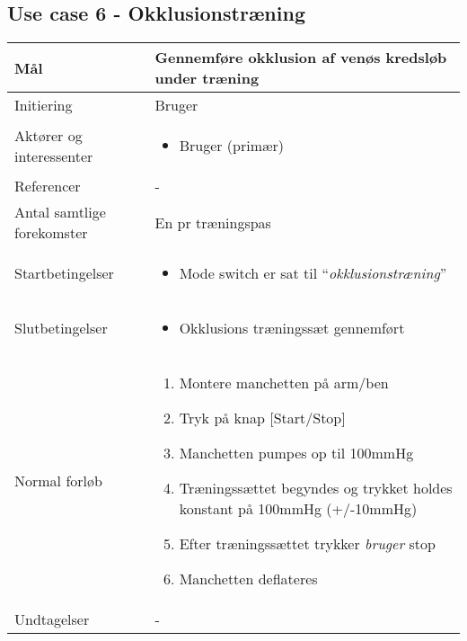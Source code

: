 	\subsection{Use case 6 - Okklusionstræning}
		\begin{center}
			\begin{tabular}{ | p{} | p{}| } 
				\hline
				Mål & Gennemføre okklusion af venøs kredsløb under træning  \\ 
				\hline
				Initiering &  Bruger\\
				\hline
				Aktører og interessenter & 
				\begin{itemize}
					\item Bruger (primær)
				\end{itemize} \\ 
				\hline
				Referencer & - \\ 
				\hline
				Antal samtlige forekomster & En pr træningspas \\ 
				\hline	
				Startbetingelser & 
				\begin{itemize}
					\item Mode switch er sat til  “\textit{okklusionstræning}”
 				\end{itemize} \\ 
				\hline
				Slutbetingelser & 
				\begin{itemize}
					\item Okklusions træningssæt gennemført
				\end{itemize} \\ 
				\hline
				Normal forløb & \begin{enumerate}
					\setlength\itemsep{0cm} %
					\item Montere manchetten på arm/ben
					\item Tryk på knap [Start/Stop]
					\item Manchetten pumpes op til 100mmHg
					\item Træningssættet begyndes og trykket holdes konstant på 100mmHg (+/-10mmHg)
					\item Efter træningssættet trykker \textit{bruger} stop
					\item Manchetten deflateres
				\end{enumerate} \\ 
				\hline
				Undtagelser & - \\ 
				\hline
			\end{tabular}
		\end{center}
	\pagebreak
		